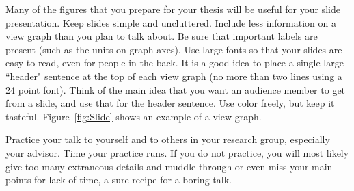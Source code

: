 Many of the figures that you prepare for your thesis will be useful
for your slide presentation. Keep slides simple and uncluttered.
Include less information on a view graph than you plan to talk
about. Be sure that important labels are present (such as the units
on graph axes). Use large fonts so that your slides are easy to
read, even for people in the back. It is a good idea to place a
single large ``header" sentence at the top of each view graph (no
more than two lines using a 24 point font). Think of the main idea
that you want an audience member to get from a slide, and use that
for the header sentence. Use color freely, but keep it tasteful.
Figure~\ref{fig:Slide} shows an example of a view graph.

Practice your talk to yourself and to others in your research group,
especially your advisor. Time your practice runs. If you do not
practice, you will most likely give too many extraneous details and
muddle through or even miss your main points for lack of time, a
sure recipe for a boring talk.

